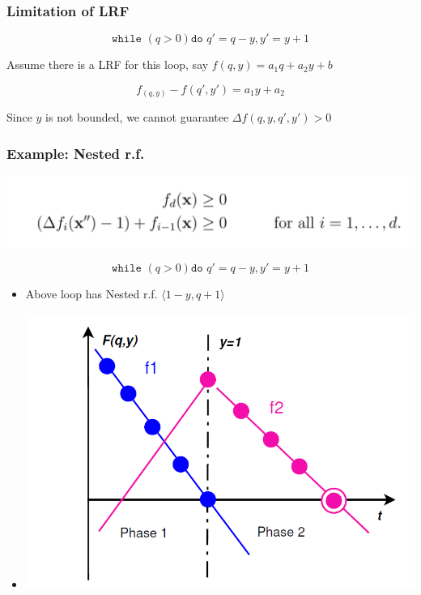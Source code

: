 \documentclass[11pt]{beamer}
\begin{document}
\begin{frame}\frametitle{Limitation of LRF}
\[\texttt{while } (q > 0) \texttt{do } q' = q - y, y ' = y + 1\]

Assume there is a LRF for this loop, say $f(q, y) = a_1 q + a_2 y + b$

\[f_(q, y) - f(q', y') = a_1y + a_2\]


Since $y$ is not bounded, we cannot guarantee  $\Delta f(q,y,q',y') > 0$

\end{frame}

\begin{frame}\frametitle{Example: Nested r.f.}
\begin{center}
\includegraphics[scale = 0.3]{6.PNG}

\end{center}

\[\texttt{while } (q > 0) \texttt{do } q' = q - y, y ' = y + 1\]

\begin{itemize}
\item Above loop has Nested r.f. $\langle 1-y, q + 1\rangle$
\item 
\begin{center}
\includegraphics[scale = 0.35]{10.PNG}
\end{center}
\end{itemize}
\end{frame}
\end{document}
